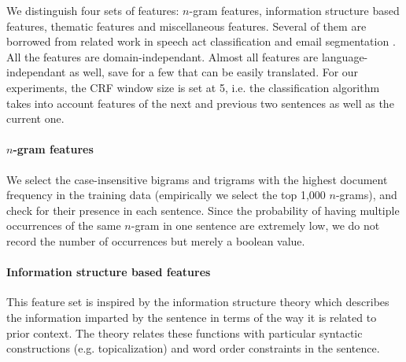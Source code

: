 We distinguish four sets of features:  $n$-gram features, information structure based features, thematic features and miscellaneous features.
Several of them are borrowed from related work in speech act classification \cite{qadir2011classifying} and email segmentation \cite{lampert2009segmenting}. All the features are domain-independant. Almost all features are language-independant as well, save for a few that can be easily translated.
For our experiments, the CRF window size is set at 5, i.e. the classification algorithm takes into account features of the next and previous two sentences as well as the current one.



\paragraph{$n$-gram features}
%
We select the case-insensitive bigrams and trigrams with the highest document frequency in the training data (empirically we select the top 1,000 $n$-grams), and check for their presence in each sentence. Since the probability of having multiple occurrences of the same $n$-gram in one sentence are extremely low, we do not record the number of occurrences but merely a boolean value. %


\paragraph{Information structure based features}

This feature set is inspired by the information structure theory \cite{kruijff:1996} which 
describes the information imparted by the sentence in terms of the way it is related to prior context. %
 The theory relates these functions with particular syntactic constructions (e.g. topicalization) and word order constraints in the sentence.
%


